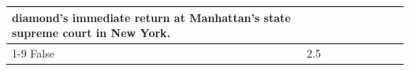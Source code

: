 \begin{table}[H]
\begin{tabular}{lllrlllll}
diamond’s immediate return at Manhattan’s state supreme court in New York.   \\
\cline{1-9}
False & 2.5%

\end{tabular}
\end{table}
